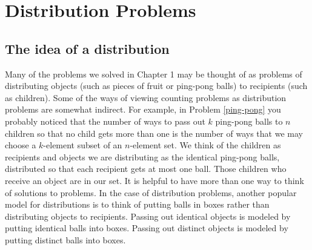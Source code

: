 \chapter{Distribution Problems}
\section{The idea of a distribution}
Many of the problems we solved in Chapter 1 may be thought of as problems
of distributing objects (such as pieces of fruit or ping-pong balls) to
recipients (such as children).  Some of the ways of viewing counting
problems as distribution problems are somewhat indirect.  For example, in
Problem
\ref{ping-pong} you probably noticed that the number of ways to pass out
$k$ ping-pong balls to $n$ children so that no child gets more than one is
the number of ways that we may choose a
$k$-element subset of
an $n$-element set.  We think of the children as recipients and objects we
are distributing as the identical ping-pong balls, distributed so that
each recipient gets at most one ball.  Those children who receive an
object are in our set.  It is helpful to have more than one way to think
of solutions to problems.  In the case of distribution problems, another
popular model for distributions is to think of putting balls in boxes
rather than distributing objects to recipients.  Passing out identical
objects is modeled by putting identical balls into boxes.  Passing out
distinct objects is modeled by putting distinct balls into boxes.


